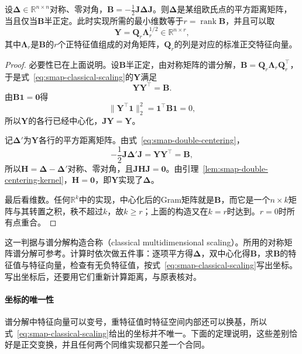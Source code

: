 \begin{theorem}[欧氏可实现的判据]
\label{thm:smap-realizability}
设$\bm\Delta\in\mathbb R^{n\times n}$对称、零对角，$\bm B=-\frac12\bm J\bm\Delta\bm J$。则$\bm\Delta$是某组欧氏点的平方距离矩阵，当且仅当$\bm B$半正定。此时实现所需的最小维数等于$r=\operatorname{rank}\bm B$，并且可以取
\begin{equation}
 \bm Y=\bm Q_r\bm\Lambda_r^{1/2}\in\mathbb R^{n\times r},
 \label{eq:smap-classical-scaling}
\end{equation}
其中$\bm\Lambda_r$是$\bm B$的$r$个正特征值组成的对角矩阵，$\bm Q_r$的列是对应的标准正交特征向量。
\end{theorem}
\begin{proof}
必要性已在上面说明。设$\bm B$半正定，由对称矩阵的谱分解，$\bm B=\bm Q_r\bm\Lambda_r\bm Q_r^\top$，于是式~\eqref{eq:smap-classical-scaling}的$\bm Y$满足
\[
 \bm Y\bm Y^\top=\bm B .
\]
由$\bm B\bm1=\bm0$得
\[
 \lVert\bm Y^\top\bm1\rVert_2^2=\bm1^\top\bm B\bm1=0 ,
\]
所以$\bm Y$的各行已经中心化，$\bm J\bm Y=\bm Y$。

记$\bm\Delta'$为$\bm Y$各行的平方距离矩阵。由式~\eqref{eq:smap-double-centering}，
\[
 -\frac12\bm J\bm\Delta'\bm J=\bm Y\bm Y^\top=\bm B ,
\]
所以$\bm H=\bm\Delta-\bm\Delta'$对称、零对角，且$\bm J\bm H\bm J=\bm0$。由引理~\ref{lem:smap-double-centering-kernel}，$\bm H=\bm0$，即$\bm Y$实现了$\bm\Delta$。

最后看维数。任何$\mathbb R^k$中的实现，中心化后的Gram矩阵就是$\bm B$，而它是一个$n\times k$矩阵与其转置之积，秩不超过$k$，故$k\geq r$；上面的构造又在$k=r$时达到。$r=0$时所有点重合。
\end{proof}

这一判据与谱分解构造合称（classical multidimensional scaling）。所用的对称矩阵谱分解可参考。计算时依次做五件事：逐项平方得$\bm\Delta$，双中心化得$\bm B$，求$\bm B$的特征值与特征向量，检查有无负特征值，按式~\eqref{eq:smap-classical-scaling}写出坐标。写出坐标后，还要用它们重新计算距离，与原表核对。

\paragraph{坐标的唯一性}

谱分解中特征向量可以变号，重特征值时特征空间内部还可以换基，所以式~\eqref{eq:smap-classical-scaling}给出的坐标并不唯一。下面的定理说明，这些差别恰好是正交变换，并且任何两个同维实现都只差一个合同。

